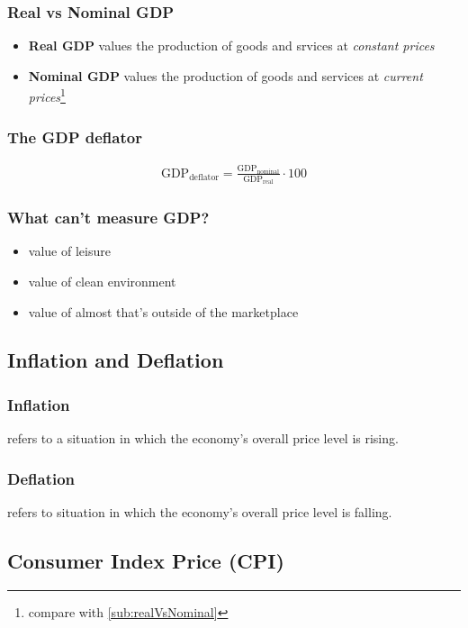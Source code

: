 \documentclass[a4paper,titlepage] {scrartcl}
\begin{document}
\subsubsection{Real vs Nominal GDP}
\begin{itemize}
	\item \textbf{Real GDP} values the production of goods and srvices at \emph{constant prices}
	\item \textbf{Nominal GDP} values the production of goods and services at \emph{current prices}\footnote{compare with \ref{sub:realVsNominal}}
\end{itemize}

\subsubsection{The GDP deflator}
\begin{eqnarray*}
	\text{GDP}_\text{deflator}=\frac{\text{GDP}_\text{nominal}}{\text{GDP}_\text{real}}\cdot100
\end{eqnarray*}

\subsubsection{What can't measure GDP?}
\begin{itemize}
	\item value of leisure
	\item value of clean environment
	\item value of almost that's outside of the marketplace
\end{itemize}

\subsection{Inflation and Deflation}
\subsubsection{Inflation}
refers to a situation in which the economy's overall price level is rising. 

\subsubsection{Deflation}
refers to situation in which the economy's overall price level is falling.

\subsection{Consumer Index Price (CPI)}
\end{document}
